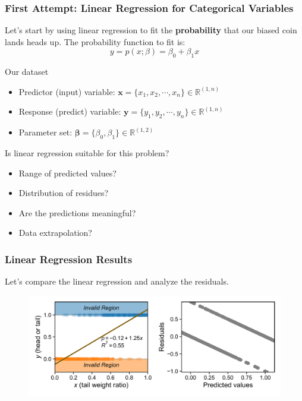 \documentclass[10pt,aspectratio=169]{beamer}
\begin{document}
\begin{frame}
  \frametitle{First Attempt: Linear Regression for Categorical Variables}

  Let's start by using linear regression to fit the
  \textbf{probability} that our biased coin lands heads up. The
  probability function to fit is:
  \begin{equation*}
    y = p(x; \mathbb{\beta}) = \beta_{0} + \beta_{1} x
  \end{equation*}

  \vfill Our dataset
  \begin{itemize}
  \item Predictor (input) variable:
    $\mathbf{x} = \{x_{1}, x_{2}, \cdots, x_{n}\} \in \mathbb{R}^{(1,
      n)}$
  \item Response (predict) variable:
    $\mathbf{y} = \{y_{1}, y_{2}, \cdots, y_{n}\} \in \mathbb{R}^{(1,
      n)}$
  \item Parameter set:
    $\mathbf{\beta} = \{\beta_{0}, \beta_{1}\} \in \mathbb{R}^{(1,
      2)}$
  \end{itemize}

  \vfill Is linear regression suitable for this problem?
  \begin{itemize}
  \item Range of predicted values?
  \item Distribution of residues?
  \item Are the predictions meaningful?
  \item Data extrapolation?
  \end{itemize}
\end{frame}


\begin{frame}
  \frametitle{Linear Regression Results}
  Let's compare the linear regression and analyze the residuals.
  \begin{figure}
    \centering %
    \hspace*{-0.05\textwidth}%
    \includegraphics[width=1.10\textwidth]{scripts/coin_linear_combined.pdf}
  \end{figure}
\end{frame}
  
\end{document}

